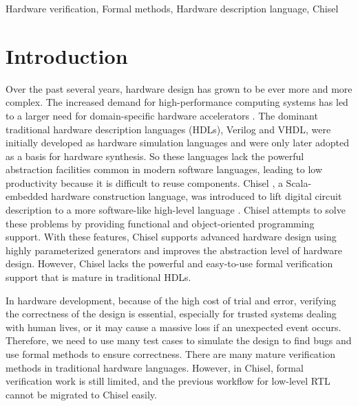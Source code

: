 \documentclass[conference]{IEEEtran}
\theoremstyle{definition}
\begin{document}
\begin{IEEEkeywords}
    Hardware verification, Formal methods, Hardware description language, Chisel
\end{IEEEkeywords}

\section{Introduction}
Over the past several years, hardware design has grown to be ever more and more complex. The increased demand for high-performance computing systems has led to a larger need for domain-specific hardware accelerators \cite{dally2020domain}.
The dominant traditional hardware description languages (HDLs), Verilog and VHDL, were initially developed as hardware simulation languages and were only later adopted as a basis for hardware synthesis. So these languages lack the powerful abstraction facilities common in modern software languages, leading to low productivity because it is difficult to reuse components.
Chisel \cite{bachrach2012chisel}, a Scala-embedded hardware construction language, was introduced to lift digital circuit description to a more software-like high-level language \cite{dobis2021chiselverify}.
Chisel attempts to solve these problems by providing functional and object-oriented programming support. With these features, Chisel supports advanced hardware design using highly parameterized generators and improves the abstraction level of hardware design. However, Chisel lacks the powerful and easy-to-use formal verification support that is mature in traditional HDLs.

In hardware development, because of the high cost of trial and error, verifying the correctness of the design is essential, especially for trusted systems dealing with human lives, or it may cause a massive loss if an unexpected event occurs. Therefore, we need to use many test cases to simulate the design to find bugs and use formal methods to ensure correctness. There are many mature verification methods in traditional hardware languages. However, in Chisel, formal verification work is still limited, and the previous workflow for low-level RTL cannot be migrated to Chisel easily.
\end{document}
